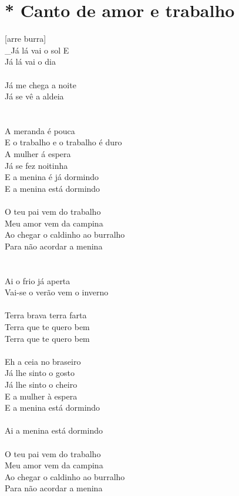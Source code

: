 \documentclass{article}
\begin{document}
\section{ * Canto de amor e trabalho}
[arre burra]\\
_Já lá vai o sol                   E\\
Já lá vai o dia\\
[anda bonita, anda burra]\\
Já me chega a noite\\
Já se vê a aldeia\\
[é bonita toma lá mais rédea]\\
[ah que nos doi o corpo]\\
A meranda é pouca\\
E o trabalho e o trabalho é duro\\
A mulher á espera\\
Já se fez noitinha\\
E a menina é já dormindo\\
E a menina está dormindo\\
\\
O teu pai vem do trabalho\\
Meu amor vem da campina\\
Ao chegar o caldinho ao burralho\\
Para não acordar a menina\\
\\
[arre burra é bonita vamos embora]\\
Ai o frio já aperta\\
Vai-se o verão vem o inverno\\
[arreda que vai doido brrr]\\
Terra brava terra farta\\
Terra que te quero bem\\
Terra que te quero bem\\
[eh bonita dá mais rédea, ah já se vê a casa]\\
Eh a ceia no braseiro\\
Já lhe sinto o gosto\\
Já lhe sinto o cheiro\\
E a mulher à espera\\
E a menina está dormindo\\
[oh bonita]\\
Ai a menina está dormindo\\
\\
O teu pai vem do trabalho\\
Meu amor vem da campina\\
Ao chegar o caldinho ao burralho\\
Para não acordar a menina\\
\\
\end{document}

